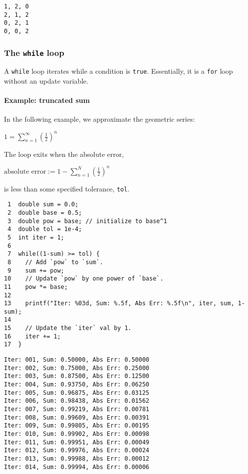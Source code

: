 \documentclass[11pt]{article}
\begin{document}
\begin{verbatim}
1, 2, 0
2, 1, 2
0, 2, 1
0, 0, 2
\end{verbatim}

\subsubsection{The \texttt{while} loop}
\label{sec:orgheadline31}
A \texttt{while} loop iterates while a condition is \texttt{true}. Essentially, it is a \texttt{for}
loop without an update variable.

\paragraph{Example: truncated sum}
\label{sec:orgheadline29}
In the following example, we approximate the geometric series:

\(1 = \sum_{n=1}^{\infty} \left(\frac{1}{2}\right)^n\)

The loop exits when the absolute error, 

\(\text{absolute error} := 1-\sum_{n=1}^N  \left(\frac{1}{2}\right)^n\)

is less than some specified tolerance, \texttt{tol}.

\begin{verbatim}
 1  double sum = 0.0;
 2  double base = 0.5;
 3  double pow = base; // initialize to base^1
 4  double tol = 1e-4;
 5  int iter = 1;
 6  
 7  while((1-sum) >= tol) {
 8    // Add `pow` to `sum`.
 9    sum += pow;
10    // Update `pow` by one power of `base`.
11    pow *= base;
12  
13    printf("Iter: %03d, Sum: %.5f, Abs Err: %.5f\n", iter, sum, 1-sum); 
14  
15    // Update the `iter` val by 1.
16    iter += 1;
17  }
\end{verbatim}

\begin{verbatim}
Iter: 001, Sum: 0.50000, Abs Err: 0.50000
Iter: 002, Sum: 0.75000, Abs Err: 0.25000
Iter: 003, Sum: 0.87500, Abs Err: 0.12500
Iter: 004, Sum: 0.93750, Abs Err: 0.06250
Iter: 005, Sum: 0.96875, Abs Err: 0.03125
Iter: 006, Sum: 0.98438, Abs Err: 0.01562
Iter: 007, Sum: 0.99219, Abs Err: 0.00781
Iter: 008, Sum: 0.99609, Abs Err: 0.00391
Iter: 009, Sum: 0.99805, Abs Err: 0.00195
Iter: 010, Sum: 0.99902, Abs Err: 0.00098
Iter: 011, Sum: 0.99951, Abs Err: 0.00049
Iter: 012, Sum: 0.99976, Abs Err: 0.00024
Iter: 013, Sum: 0.99988, Abs Err: 0.00012
Iter: 014, Sum: 0.99994, Abs Err: 0.00006
\end{verbatim}
\end{document}
